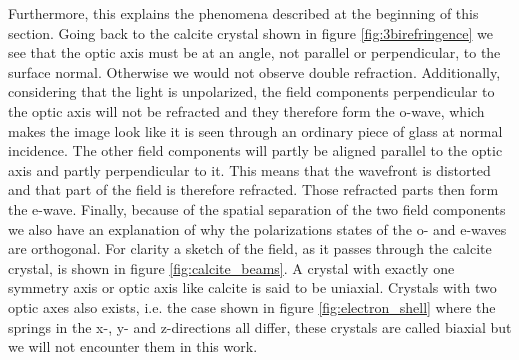 Furthermore, this explains the phenomena described at the beginning of this section. Going back to the calcite crystal shown in figure \ref{fig:3birefringence} we see that the optic axis must be at an angle, not parallel or perpendicular, to the surface normal. Otherwise we would not observe double refraction. Additionally, considering that the light is unpolarized, the field components perpendicular to the optic axis will not be refracted and they therefore form the o-wave, which makes the image look like it is seen through an ordinary piece of glass at normal incidence. The other field components will partly be aligned parallel to the optic axis and partly perpendicular to it. This means that the wavefront is distorted and that part of the field is therefore refracted. Those refracted parts then form the e-wave. Finally, because of the spatial separation of the two field components we also have an explanation of why the polarizations states of the o- and e-waves are orthogonal. For clarity a sketch of the field, as it passes through the calcite crystal, is shown in figure \ref{fig:calcite_beams}. A crystal with exactly one symmetry axis or optic axis like calcite is said to be uniaxial. Crystals with two optic axes also exists, i.e. the case shown in figure \ref{fig:electron_shell} where the springs in the x-, y- and z-directions all differ, these crystals are called biaxial but we will not encounter them in this work. 

